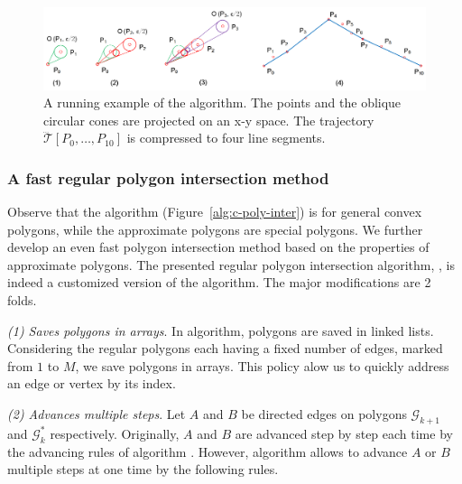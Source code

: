 \begin{figure}[tb!]
\centering
\includegraphics[scale=0.8]{figures/Fig-ex-conest.png}
\vspace{-1ex}
\caption{\small A running example of the \cist algorithm. The points and the oblique circular cones are projected on an x-y space. The trajectory $\dddot{\mathcal{T}}[P_0, \ldots, P_{10}]$ is compressed to four line segments.}
\vspace{-2ex}
\label{fig:exm-const}
\end{figure}



\subsubsection{A fast regular polygon intersection method}


Observe that the \cpia algorithm (Figure~\ref{alg:c-poly-inter}) is for general convex polygons, while the approximate polygons are special polygons. We further develop an even fast polygon intersection method based on the properties of approximate polygons.
%
The presented regular polygon intersection algorithm, \ie \rpia, is indeed a customized version of the \cpia algorithm.
The major modifications are 2 folds.

\ni \emph{{(1) Saves polygons in arrays}}.
In \cpia algorithm, polygons are saved in linked lists.
Considering the regular polygons each having a fixed number of edges, marked from $1$ to $M$, we save polygons in arrays. This policy alow us to quickly address an edge or vertex by its index.


\ni \emph{(2) Advances multiple steps}.
Let $A$ and $B$ be directed edges on polygons $\mathcal{G}_{k+1}$ and $\mathcal{G}^*_k$ respectively.
Originally, $A$ and $B$ are advanced step by step each time by the advancing rules of algorithm \cpia .
%
However, algorithm \rpia allows to advance $A$ or $B$ multiple steps at one time by the following rules.

